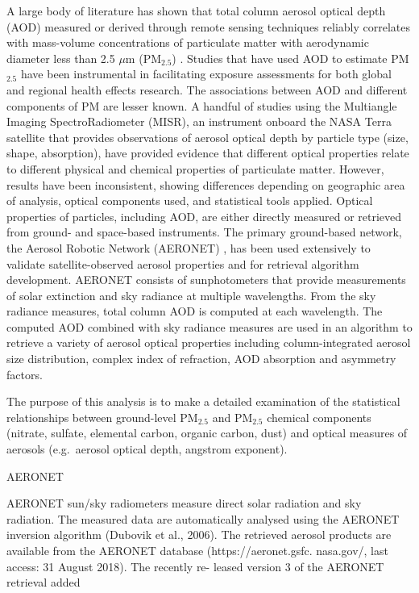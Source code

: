 \documentclass[, manuscript]{copernicus}
\begin{document}
A large body of literature has shown that total column aerosol optical
depth (AOD) measured or derived through remote sensing techniques
reliably correlates with mass-volume concentrations of particulate
matter with aerodynamic diameter less than 2.5 \(\mu\)m (PM\(_{2.5}\))
\cite{VanDonkelaar2019}. Studies that have used AOD to estimate
PM\(_{2.5}\) have been instrumental in facilitating exposure assessments
for both global \cite{Cohen2017} and regional \cite{Chau2020} health
effects research. The associations between AOD and different components
of PM are lesser known. A handful of studies using the Multiangle
Imaging SpectroRadiometer (MISR), an instrument onboard the NASA Terra
satellite that provides observations of aerosol optical depth by
particle type (size, shape, absorption), have provided evidence that
different optical properties relate to different physical
\cite{Franklin2017} and chemical \cite{Meng2018, Franklin2018, Chau2020}
properties of particulate matter. However, results have been
inconsistent, showing differences depending on geographic area of
analysis, optical components used, and statistical tools applied.
Optical properties of particles, including AOD, are either directly
measured or retrieved from ground- and space-based instruments. The
primary ground-based network, the Aerosol Robotic Network (AERONET)
\cite{Holben1998}, has been used extensively to validate
satellite-observed aerosol properties and for retrieval algorithm
development. AERONET consists of sunphotometers that provide
measurements of solar extinction and sky radiance at multiple
wavelengths. From the sky radiance measures, total column AOD is
computed at each wavelength. The computed AOD combined with sky radiance
measures are used in an algorithm \cite{Dubovik2000, Dubovik2006} to
retrieve a variety of aerosol optical properties including
column-integrated aerosol size distribution, complex index of
refraction, AOD absorption and asymmetry factors.

The purpose of this analysis is to make a detailed examination of the
statistical relationships between ground-level PM\(_{2.5}\) and
PM\(_{2.5}\) chemical components (nitrate, sulfate, elemental carbon,
organic carbon, dust) and optical measures of aerosols (e.g.~aerosol
optical depth, angstrom exponent).

AERONET \cite{Holben1998, Shin2018b, Shin2019b, Shin2019}

AERONET sun/sky radiometers measure direct solar radiation and sky
radiation. The measured data are automatically analysed using the
AERONET inversion algorithm (Dubovik et al., 2006). The retrieved
aerosol products are available from the AERONET database
(https://aeronet.gsfc. nasa.gov/, last access: 31 August 2018). The
recently re- leased version 3 of the AERONET retrieval added
\end{document}
